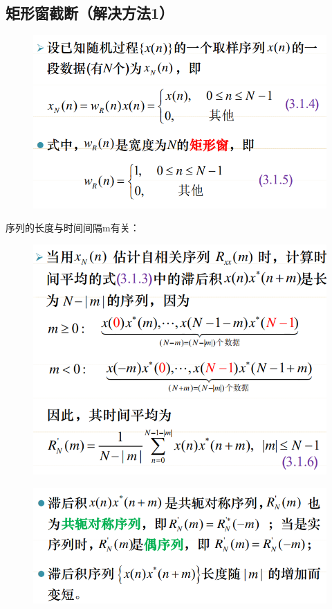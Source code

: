\documentclass[UTF8]{ctexart} %
\begin{document}
			\subsection{矩形窗截断（解决方法1）}
				\begin{figure}[H]
					\centering\includegraphics[scale=0.4]{70.png}
				\end{figure}
				序列的长度与时间间隔m有关：
				\begin{figure}[H]
					\centering\includegraphics[scale=0.4]{71.png}
				\end{figure}
				\begin{figure}[H]
				\centering\includegraphics[scale=0.4]{72.png}
				\end{figure}
\end{document}
